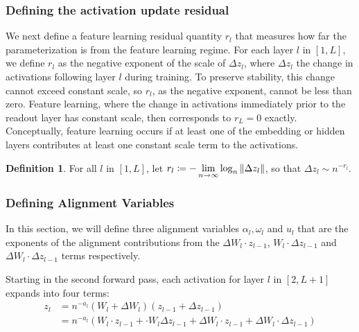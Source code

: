 \documentclass{article}
\theoremstyle{plain}
\theoremstyle{definition}
\newtheorem{appendixdef}{Definition}[section]
\theoremstyle{remark}
\begin{document}
\subsubsection{Defining the activation update residual}
We next define a feature learning residual quantity $r_l$ that measures how far the parameterization is from the feature learning regime. For each layer $l$ in $[1, L]$, we define $r_l$ as the negative exponent of the scale of $\Delta z_l$, where $\Delta z_l$ the change in activations following layer $l$ during training. To preserve stability, this change cannot exceed constant scale, so $r_l$, as the negative exponent, cannot be less than zero. Feature learning, where the change in activations immediately prior to the readout layer has constant scale, then corresponds to $r_L = 0$ exactly. Conceptually, feature learning occurs if at least one of the embedding or hidden layers contributes at least one constant scale term to the activations.

\begin{appendixdef}
For all $l$ in $[1, L]$, let $\displaystyle r_l \coloneqq - \lim_{n \rightarrow \infty} \log_n \norm{\Delta z_l}$, so that $\Delta z_l \sim n^{-r_l}$.
\end{appendixdef}


\subsubsection{Defining Alignment Variables}
\label{app:theory_align_vars}

In this section, we will define three alignment variables $\alpha_l, \omega_l$ and $u_l$ that are the exponents of the alignment contributions from the $\Delta W_l \cdot z_{l-1} $, $W_l \cdot \Delta z_{l-1}$ and $ \Delta W_l \cdot \Delta z_{l-1}$ terms respectively.

Starting in the second forward pass, each activation for layer $l$ in $[2,L+1]$ expands into four terms:
\begin{align*}
    z_l &= n^{-a_l}(W_l + \Delta W_l)(z_{l-1} + \Delta z_{l-1})\\
    &= n^{-a_l}( W_l \cdot z_{l-1} +  \cdot W_l \Delta z_{l-1}  + \Delta W_l \cdot z_{l-1}  + \Delta W_l \cdot \Delta z_{l-1})
\end{align*}
\end{document}
